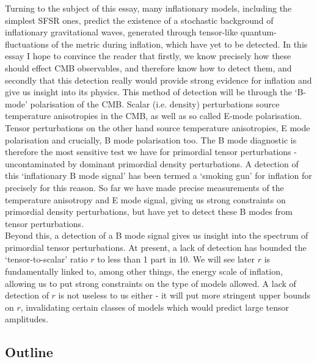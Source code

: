\documentclass[a4paper,10pt]{article}
\begin{document}
Turning to the subject of this essay, many inflationary models, including the simplest SFSR ones, predict the existence of a stochastic background of inflationary gravitational waves, generated through tensor-like quantum-fluctuations of the metric during inflation, which have yet to be detected. In this essay I hope to convince the reader that firstly, we know precisely how these should effect CMB observables, and therefore know how to detect them, and secondly that this detection really would provide strong evidence for inflation and give us insight into its physics. This method of detection will be through the `B-mode' polarisation of the CMB. Scalar (i.e. density) perturbations source temperature anisotropies in the CMB, as well as so called E-mode polarisation. Tensor perturbations on the other hand source temperature anisotropies, E mode polarisation and crucially, B mode polarisation too. The B mode diagnostic is therefore the most sensitive test we have for primordial tensor perturbations - uncontaminated by dominant primordial density perturbations. A detection of this `inflationary B mode signal' has been termed a `smoking gun' for inflation for precisely for this reason. So far we have made precise measurements of the temperature anisotropy and E mode signal, giving us strong constraints on primordial density perturbations, but have yet to detect these B modes from tensor perturbations. \\

Beyond this, a detection of a B mode signal gives us insight into the spectrum of primordial tensor perturbations. At present, a lack of detection has bounded the `tensor-to-scalar' ratio $r$ to less than 1 part in 10. We will see later $r$ is fundamentally linked to, among other things, the energy scale of inflation, allowing us to put strong constraints on the type of models allowed. A lack of detection of $r$ is not useless to us either - it will put more stringent upper bounds on $r$, invalidating certain classes of models which would predict large tensor amplitudes.\\

\subsection{Outline}
\end{document}
